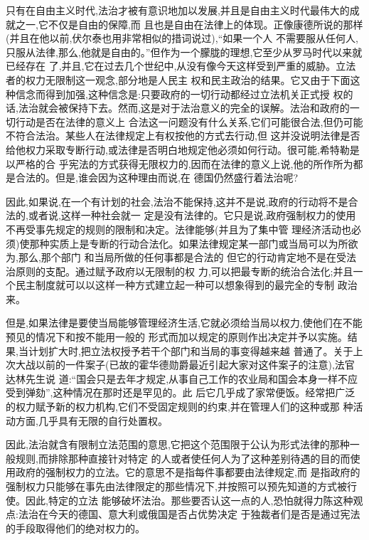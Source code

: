 ﻿\documentclass[12pt]{article}
\begin{document}
只有在自由主义时代,法治才被有意识地加以发展,并且是自由主义时代最伟大的成就之一,它不仅是自由的保障,而
且也是自由在法律上的体现。正像康德所说的那样(并且在他以前,伏尔泰也用非常相似的措词说过),``如果一个人
不需要服从任何人,只服从法律,那么,他就是自由的。''但作为一个朦胧的理想,它至少从罗马时代以来就已经存在
了,并且,它在过去几个世纪中,从没有像今天这样受到严重的威胁。立法者的权力无限制这一观念,部分地是人民主
权和民主政治的结果。它又由于下面这种信念而得到加强,这种信念是:只要政府的一切行动都经过立法机关正式授
权的话,法治就会被保持下去。然而,这是对于法治意义的完全的误解。法治和政府的一切行动是否在法律的意义上
合法这一问题没有什么关系,它们可能很合法,但仍可能不符合法治。某些人在法律规定上有权按他的方式去行动,但
这并没说明法律是否给他权力采取专断行动,或法律是否明白地规定他必须如何行动。很可能,希特勒是以严格的合
乎宪法的方式获得无限权力的,因而在法律的意义上说,他的所作所为都是合法的。但是,谁会因为这种理由而说,在
德国仍然盛行着法治呢?

因此,如果说,在一个有计划的社会,法治不能保持,这并不是说,政府的行动将不是合法的,或者说,这样一种社会就一
定是没有法律的。它只是说,政府强制权力的使用不再受事先规定的规则的限制和决定。法律能够(并且为了集中管
理经济活动也必须)使那种实质上是专断的行动合法化。如果法律规定某一部门或当局可以为所欲为,那么,那个部门
和当局所做的任何事都是合法的 \myrule 但它的行动肯定地不是在受法治原则的支配。通过赋予政府以无限制的权
力,可以把最专断的统治合法化;并且一个民主制度就可以以这样一种方式建立起一种可以想象得到的最完全的专制
政治来。

但是,如果法律是要使当局能够管理经济生活,它就必须给当局以权力,使他们在不能预见的情况下和按不能用一般的
形式而加以规定的原则作出决定并予以实施。结果,当计划扩大时,把立法权授予若干个部门和当局的事变得越来越
普通了。关于上次大战以前的一件案子(已故的霍华德勋爵最近引起大家对这件案子的注意),法官达林先生说
道:``国会只是去年才规定,从事自己工作的农业局和国会本身一样不应受到弹劾'',这种情况在那时还是罕见的。此
后它几乎成了家常便饭。经常把广泛的权力赋予新的权力机构,它们不受固定规则的约束,并在管理人们的这种或那
种活动方面,几乎具有无限的自行处置权。

因此,法治就含有限制立法范围的意思,它把这个范围限于公认为形式法律的那种一般规则,而排除那种直接针对特定
的人或者使任何人为了这种差别待遇的目的而使用政府的强制权力的立法。它的意思不是指每件事都要由法律规定,而
是指政府的强制权力只能够在事先由法律限定的那些情况下,并按照可以预先知道的方式被行使。因此,特定的立法
能够破坏法治。那些要否认这一点的人,恐怕就得力陈这种观点:法治在今天的德国、意大利或俄国是否占优势决定
于独裁者们是否是通过宪法的手段取得他们的绝对权力的。
\end{document}
